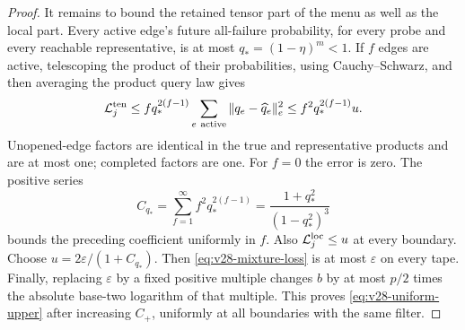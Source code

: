 \begin{proof}
It remains to bound the retained tensor part of the menu as well as
the local part. Every active edge's future all-failure probability,
for every probe and every reachable representative, is at most
$q_*=(1-\eta)^m<1$. If $f$ edges are active, telescoping the product
of their probabilities, using Cauchy--Schwarz, and then averaging the
product query law gives
\[
 \mathcal L_j^{\rm ten}
    \le f q_*^{2(f-1)}
                  \sum_{e\ {\mathrm{active}}}\|q_e-\widehat q_e\|_e^2
    \le f^2q_*^{2(f-1)}u.
\]
Unopened-edge factors are identical in the true and representative
products and are at most one; completed factors are one. For $f=0$
the error is zero. The positive series
\[
 C_{q_*}=\sum_{f=1}^\infty f^2q_*^{2(f-1)}
                        =\frac{1+q_*^2}{(1-q_*^2)^3}
\]
bounds the preceding coefficient uniformly in $f$. Also
$\mathcal L_j^{\rm loc}\le u$ at every boundary. Choose
$u=2\varepsilon/(1+C_{q_*})$. Then
\eqref{eq:v28-mixture-loss} is at most $\varepsilon$ on every tape.
Finally, replacing $\varepsilon$ by a fixed positive multiple changes
$b$ by at most $p/2$ times the absolute base-two logarithm of that
multiple. This proves \eqref{eq:v28-uniform-upper} after increasing
$C_+$, uniformly at all boundaries with the same filter.
\end{proof}
